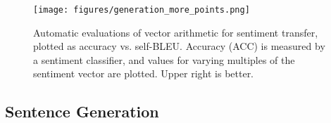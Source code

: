 \begin{figure}[ht]
\vspace{-5.5mm}
\centering
\hspace{-2mm}\texttt{[image: figures/generation\_more\_points.png]}
\caption{ 
Automatic evaluations of vector arithmetic for sentiment transfer, plotted as accuracy vs. self-BLEU. Accuracy (ACC) is measured by a sentiment classifier, and values for varying multiples of the sentiment vector are plotted. Upper right is better.
\label{fig:generation}
}
\end{figure}
\subsection{Sentence Generation} \label{sec:gen}



